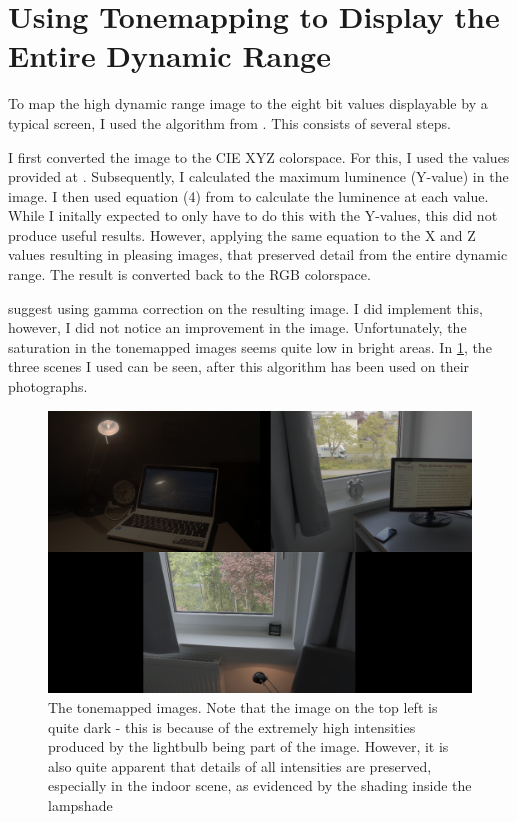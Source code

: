 \section{Using Tonemapping to Display the Entire Dynamic Range}\label{sec:toma}

To map the high dynamic range image to the eight bit values displayable by a
typical screen, I used the algorithm from \cite{dmac03}. This consists of
several steps.

I first converted the image to the CIE XYZ colorspace. For this,
I used the values provided at \cite{wik16}. Subsequently, I calculated the
maximum luminence (Y-value) in the image. I then used equation (4) from
\cite{dmac03} to calculate the luminence at each value. While I initally
expected to only have to do this with the Y-values, this did not produce useful
results. However, applying the same equation to the X and Z values resulting in
pleasing images, that preserved detail from the entire dynamic range. The
result is converted back to the RGB colorspace.

\cite{dmac03} suggest using gamma correction on the resulting image. I did
implement this, however, I did not notice an improvement in the image.
Unfortunately, the saturation in the tonemapped images seems quite low in
bright areas. In \ref{fig:toma}, the three scenes I used can be seen, after
this algorithm has been used on their photographs.

\begin{figure}[h]
  \centering
  \includegraphics[width=\textwidth]{toma.png}
  \caption{The tonemapped images. Note that the image on the top left is quite
  dark - this is because of the extremely high intensities produced by the
  lightbulb being part of the image. However, it is also quite apparent that
  details of all intensities are preserved, especially in the indoor scene, as
  evidenced by the shading inside the lampshade}
  \label{fig:toma}
\end{figure}
